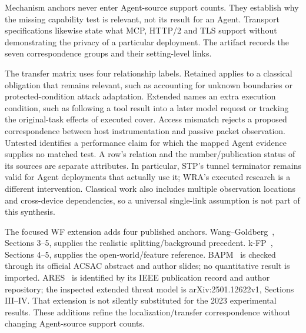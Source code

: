 Mechanism anchors never enter Agent-source support counts. They establish why the missing capability test is relevant, not its result for an Agent. Transport specifications likewise state what MCP, HTTP/2 and TLS support without demonstrating the privacy of a particular deployment. The artifact records the seven correspondence groups and their setting-level links.

The transfer matrix uses four relationship labels. Retained applies to a classical obligation that remains relevant, such as accounting for unknown boundaries or protected-condition attack adaptation. Extended names an extra execution condition, such as following a tool result into a later model request or tracking the original-task effects of executed cover. Access mismatch rejects a proposed correspondence between host instrumentation and passive packet observation. Untested identifies a performance claim for which the mapped Agent evidence supplies no matched test. A row's relation and the number/publication status of its sources are separate attributes. In particular, STP's tunnel terminator remains valid for Agent deployments that actually use it; WRA's executed research is a different intervention. Classical work also includes multiple observation locations and cross-device dependencies, so a universal single-link assumption is not part of this synthesis.


The focused WF extension adds four published anchors. Wang--Goldberg~\cite{wang2016realistic}, Sections 3--5, supplies the realistic splitting/background precedent. k-FP~\cite{hayes2016kfp}, Sections 4--5, supplies the open-world/feature reference. BAPM~\cite{guan2021bapm} is checked through its official ACSAC abstract and author slides; no quantitative result is imported. ARES~\cite{deng2023ares} is identified by its IEEE publication record and author repository; the inspected extended threat model is arXiv:2501.12622v1, Sections III--IV. That extension is not silently substituted for the 2023 experimental results. These additions refine the localization/transfer correspondence without changing Agent-source support counts.
